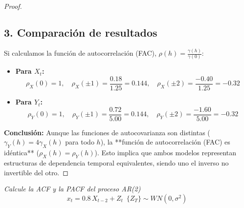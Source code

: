\documentclass[11pt,letterpaper]{article}
\begin{document}
\begin{proof}
\subsection*{3. Comparación de resultados}

Si calculamos la función de autocorrelación (FAC), $\rho(h) = \frac{\gamma(h)}{\gamma(0)}$:

\begin{itemize}
    \item \textbf{Para $X_t$:} 
    \[
    \rho_X(0) = 1, \quad \rho_X(\pm 1) = \frac{0.18}{1.25} = 0.144, \quad \rho_X(\pm 2) = \frac{-0.40}{1.25} = -0.32
    \]
    \item \textbf{Para $Y_t$:} 
    \[
    \rho_Y(0) = 1, \quad \rho_Y(\pm 1) = \frac{0.72}{5.00} = 0.144, \quad \rho_Y(\pm 2) = \frac{-1.60}{5.00} = -0.32
    \]
\end{itemize}

\textbf{Conclusión:}
Aunque las funciones de autocovarianza son distintas ($\gamma_Y(h) = 4 \gamma_X(h)$ para todo $h$), la **función de autocorrelación (FAC) es idéntica** ($\rho_X(h) = \rho_Y(h)$). Esto implica que ambos modelos representan estructuras de dependencia temporal equivalentes, siendo uno el inverso no invertible del otro. 
\end{proof}
\begin{tcolorbox}[
	title = \textcolor{black}{\textcolor{white}{Problema 4}},]
\textit{Calcule la ACF y la PACF del proceso AR(2)
\begin{equation*}
    x_t=0.8\,X_{t-2}+Z_t\,\,\,\{Z_T\}\sim WN(0,\sigma^2)
\end{equation*}}
\end{tcolorbox}
\end{document}
